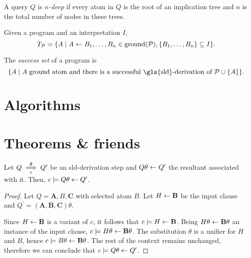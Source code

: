 \begin{dfn}[\(n\)-depth]
    A query \(Q\) is \emph{\(n\)-deep} if every atom in \(Q\) is the root of an implication tree and \(n\) is the total number of nodes in these trees.
\end{dfn}

\begin{dfn}[\(T_\prog\)]
    Given a program \prog and an interpretation \(I\),
    \begin{equation*}
        T_\mathcal{P} = \lbrace A \mid A \leftarrow B_1,\dotsc,B_n \in \operatorname{ground}(\mathcal{P}), \lbrace B_1,\dotsc,B_n \rbrace \subseteq I \rbrace.
    \end{equation*}
\end{dfn}

\begin{dfn}
    The \emph{success set} of a program \prog is
    \begin{equation*}
        \lbrace A \mid A\;\text{ground atom and there is a successful \gls{sld}-derivation of \(\prog \cup \lbrace A \rbrace\)}\rbrace.
    \end{equation*}
\end{dfn}
\section{Algorithms}

\section{Theorems \& friends}

\begin{lem}
    \label{decl:lem-1}
    Let \(Q \underset{c}{\overset{\theta}{\implies}} Q^\prime\) be an \gls{sld}-derivation step and \(Q\theta \leftarrow Q^\prime\) the resultant associated with it.
    Then, \(c \models Q\theta \leftarrow Q^\prime\).
\end{lem}
\begin{proof}
    Let \(Q = \mathbf{A}, B, \mathbf{C}\) with selected atom \(B\). Let \(H \leftarrow \mathbf{B}\) be the input clause and \(Q^\prime = (\mathbf{A},\mathbf{B},\mathbf{C})\theta\).

    Since \(H \leftarrow \mathbf{B}\) is a variant of \(c\), it follows that \(c \models H \leftarrow \mathbf{B}\).
    Being \(H\theta \leftarrow \mathbf{B}\theta\) an instance of the input clause, \(c \models H\theta \leftarrow \mathbf{B}\theta\).
    The substitution \(\theta\) is a unifier for \(H\) and \(B\), hence \(c \models B\theta \leftarrow \mathbf{B}\theta\).
    The rest of the context remains unchanged, therefore we can conclude that \(c \models Q\theta \leftarrow Q^\prime\).
\end{proof}

